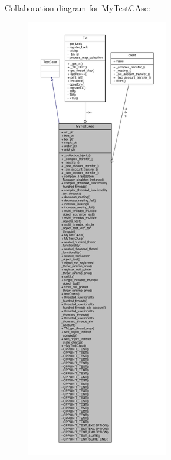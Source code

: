 Collaboration diagram for My\+Test\+C\+Ase\+:
\nopagebreak
\begin{figure}[H]
\begin{center}
\leavevmode
\includegraphics[height=550pt]{class_my_test_c_ase__coll__graph}
\end{center}
\end{figure}
